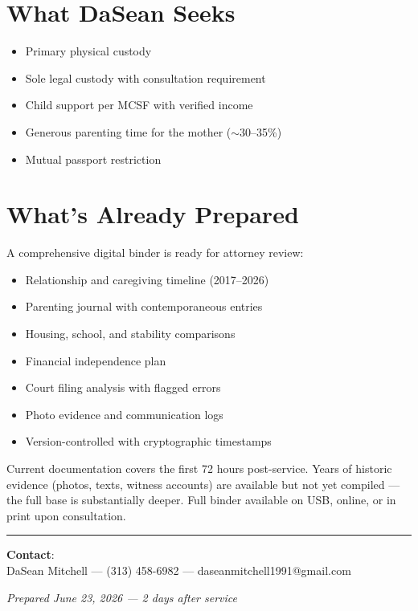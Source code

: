 \documentclass[10.5pt,letterpaper]{article}
\begin{document}
\section{What DaSean Seeks}

\begin{itemize}
\item Primary physical custody
\item Sole legal custody with consultation requirement
\item Child support per MCSF with verified income
\item Generous parenting time for the mother (\(\sim\)30--35\%)
\item Mutual passport restriction
\end{itemize}

\section{What's Already Prepared}

A comprehensive digital binder is ready for attorney review:

\begin{itemize}
\item Relationship and caregiving timeline (2017--2026)
\item Parenting journal with contemporaneous entries
\item Housing, school, and stability comparisons
\item Financial independence plan
\item Court filing analysis with flagged errors
\item Photo evidence and communication logs
\item Version-controlled with cryptographic timestamps
\end{itemize}

Current documentation covers the first 72 hours post-service. Years of historic evidence (photos, texts, witness accounts) are available but not yet compiled --- the full base is substantially deeper. Full binder available on USB, online, or in print upon consultation.

\vspace{0.5em}
\noindent\rule{\textwidth}{0.4pt}

\noindent\textbf{Contact}:\\
DaSean Mitchell --- (313) 458-6982 --- daseanmitchell1991@gmail.com

\medskip

\noindent\textit{Prepared June 23, 2026 --- 2 days after service}
\end{document}
